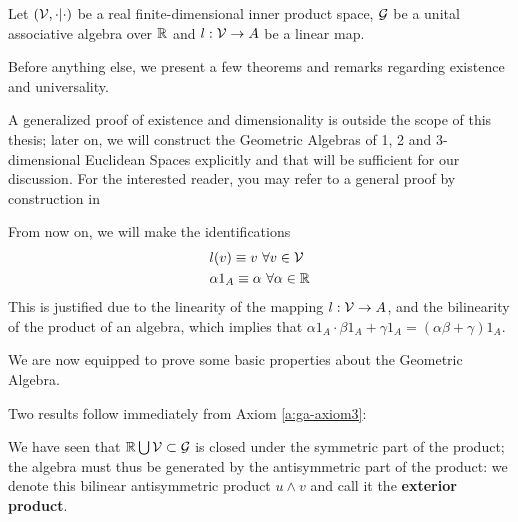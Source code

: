 Let $(\mathcal{V}, \cdot|\cdot )$ be a real finite-dimensional inner product space, $\mathcal{G}$ be a unital associative algebra over $\mathbb{R}$ and $l: \mathcal{V} \to A$ be a linear map.



Before anything else, we present a few theorems and remarks regarding existence and universality.




A generalized proof of existence and dimensionality is outside the scope of this thesis; later on, we will construct the Geometric Algebras of 1, 2 and 3-dimensional Euclidean Spaces explicitly and that will be sufficient for our discussion. For the interested reader, you may refer to a general proof by construction in \cite[Section 3.2]{clifford-algebra}

\begin{remark}
	From now on, we will make the identifications
	\begin{align*}
		&l(v) \equiv v \ \forall v \in \mathcal{V} \\
		&\alpha 1_A \equiv \alpha \ \forall \alpha \in \mathbb{R}
	\end{align*}
	This is justified due to the linearity of the mapping $l: \mathcal{V} \to A$, and the bilinearity of the product of an algebra, which implies that $\alpha 1_A \cdot \beta 1_A  + \gamma 1_A = (\alpha \beta + \gamma) 1_A$.
\end{remark}

We are now equipped to prove some basic properties about the Geometric Algebra.

Two results follow immediately from Axiom \ref{a:ga-axiom3}:





\begin{remark}
	We have seen that $\mathbb{R} \bigcup \mathcal{V} \subset \mathcal{G}$ is closed under the symmetric part of the product; the algebra must thus be generated by the antisymmetric part of the product: we denote this bilinear antisymmetric product $u \wedge v$ and call it the \textbf{exterior product}.
\end{remark}
%
%
%

